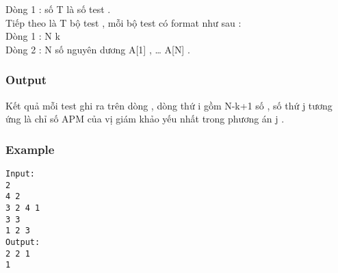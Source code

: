    Dòng 1 : số T là số test .   
\\   Tiếp theo là T bộ test , mỗi bộ test có format như sau :   
\\   Dòng 1 : N k   
\\   Dòng 2 : N số nguyên dương A[1] , … A[N] .   
\\

\subsubsection{   Output  }

   Kết quả mỗi test ghi ra trên dòng , dòng thứ i gồm N-k+1 số , số thứ j tương ứng là chỉ số APM của vị giám khảo yếu nhất trong phương án j .  

\subsubsection{   Example  }
\begin{verbatim}
Input:
2
4 2
3 2 4 1
3 3
1 2 3
Output:
2 2 1
1
\end{verbatim}
